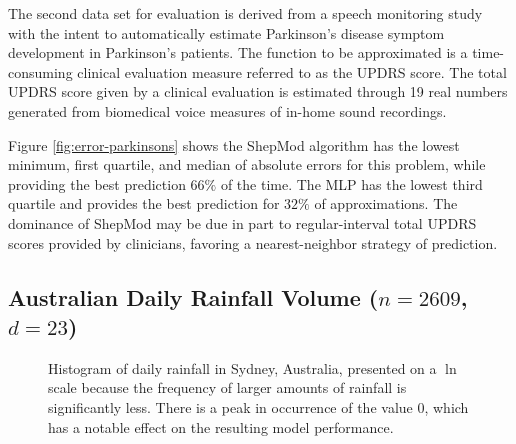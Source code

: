 \documentclass[smallextended,final]{svjour3}  %
\begin{document}
The second data set for evaluation \cite{tsanas2010accurate} is
derived from a speech monitoring study with the intent to
automatically estimate Parkinson's disease symptom development in
Parkinson's patients. The function to be approximated is a
time-consuming clinical evaluation measure referred to as the UPDRS
score. The total UPDRS score given by a clinical evaluation is
estimated through 19 real numbers generated from biomedical voice
measures of in-home sound recordings.

Figure \ref{fig:error-parkinsons} shows the ShepMod algorithm has the
lowest minimum, first quartile, and median of absolute errors for this
problem, while providing the best prediction $66\%$ of the time. The
MLP has the lowest third quartile and provides the best prediction for
$32\%$ of approximations. The dominance of ShepMod may be due in part
to regular-interval total UPDRS scores provided by clinicians,
favoring a nearest-neighbor strategy of prediction.



\subsection{Australian Daily Rainfall Volume ($n = 2609$, $d = 23$)}

\begin{figure}
  \centering
  \caption{Histogram of daily rainfall in Sydney, Australia, presented
    on a $\ln$ scale because the frequency of larger amounts of
    rainfall is significantly less. There is a peak in occurrence of
    the value $0$, which has a notable effect on the resulting model
    performance.}
  \label{fig:hist-weather}
\end{figure}
\end{document}
